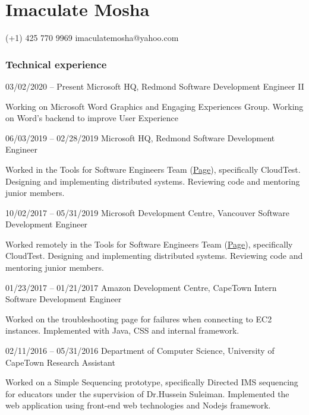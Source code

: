 \documentclass[fontsize=9pt]{tccv}
\begin{document}
\part{Imaculate Mosha}

    {(+1) 425 770 9969}
    {imaculatemosha@yahoo.com}

\section{Technical experience}

\begin{eventlist}
\item{03/02/2020 -- Present}
	{Microsoft HQ, Redmond}
	 {Software Development Engineer II}

Working on Microsoft Word Graphics and Engaging Experiences Group.
Working on Word's backend to improve User Experience


\item{06/03/2019 -- 02/28/2019}
	 {Microsoft HQ, Redmond}
	 {Software Development Engineer}
	 
Worked in the Tools for Software Engineers Team (\href{ https://www.microsoft.com/en-us/research/project/tools-for-software-engineers/}{Page}), specifically CloudTest.
Designing and implementing distributed systems.
Reviewing code and mentoring junior members.

\item{10/02/2017 -- 05/31/2019}
	 {Microsoft Development Centre, Vancouver}
	 {Software Development Engineer}
	 
Worked remotely in the Tools for Software Engineers Team (\href{ https://www.microsoft.com/en-us/research/project/tools-for-software-engineers/}{Page}), specifically CloudTest.
Designing and implementing distributed systems.
Reviewing code and mentoring junior members.


\item{01/23/2017 -- 01/21/2017}
	 {Amazon Development Centre, CapeTown}
	 {Intern Software Development Engineer}
	 
Worked on the troubleshooting page for failures when connecting to EC2 instances.
Implemented with Java, CSS and internal framework.


\item{02/11/2016 -- 05/31/2016}
	 {Department of Computer Science, University of CapeTown}
	 {Research Assistant}
	 
Worked on a Simple Sequencing prototype, specifically Directed IMS sequencing for educators under the supervision of Dr.Hussein Suleiman.  
Implemented the web application using front-end web technologies and Nodejs framework. 



\end{eventlist}
\end{document}
